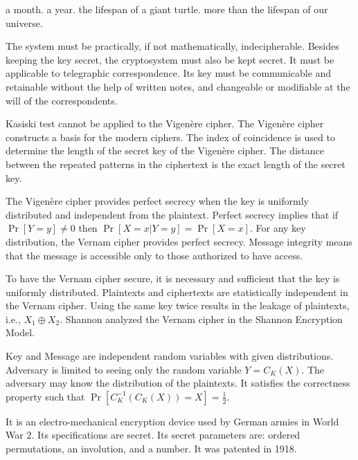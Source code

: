  {a month.}
 {a year.}
 {the lifespan of a giant turtle.}
 { more than the lifespan of our universe.}
 
 {The system must be practically, if not mathematically, indecipherable.}
 {Besides keeping the key secret, the cryptosystem must also be kept secret.}
 {It must be applicable to telegraphic correspondence. }
 {Its key must be communicable and retainable without the help of written notes, and changeable or modifiable at the will of the correspondents.}
 
{Kasiski test cannot be applied to the Vigen{\`e}re cipher.}
{The Vigen{\`e}re cipher constructs a basis for the modern ciphers.}
{The index of coincidence is used to determine the length of the secret key of the Vigen{\`e}re cipher.}
{The distance between the repeated patterns in the ciphertext is the exact length of the secret key.}

  {The Vigen{\`e}re cipher provides perfect secrecy when the key is uniformly distributed and independent from the plaintext.}
 {Perfect secrecy implies that if $\Pr[Y=y]\neq 0$ then $\Pr[X=x|Y=y]=\Pr[X=x]$.}
 {For any key distribution, the Vernam cipher provides perfect secrecy.}
 {Message integrity means that the message is accessible only to those authorized to have access.}
 
 {To have the Vernam cipher secure, it is necessary and sufficient that the key is uniformly distributed. }
 {Plaintexts and ciphertexts are statistically independent in the Vernam cipher.}
 {Using the same key twice results in the leakage of plaintexts, i.e., $X_1 \oplus X_2$.}
 {Shannon analyzed the Vernam cipher in the Shannon Encryption Model.}
 
 {Key and Message are independent random variables with given distributions.}
 {Adversary is limited to seeing only the random variable $Y=C_K(X)$.}
 {The adversary may know the distribution of the plaintexts. }
 {It satisfies the correctness property such that $\Pr[C_K^ {-1}(C_K(X))=X]=\frac{1}{2}$.}
 
 {It is an electro-mechanical encryption device used by German armies in World War 2.}
 {Its specifications are secret.}
 {Its secret parameters are: ordered permutations, an involution, and a number.}
 {It was patented in 1918.}
 
